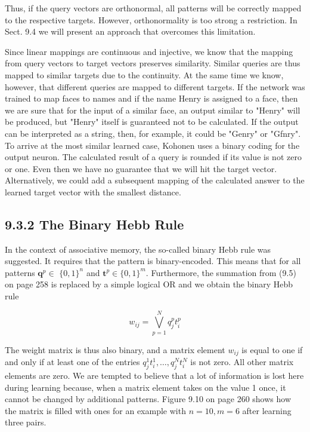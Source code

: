 \documentclass[10pt]{article}
\begin{document}
Thus, if the query vectors are orthonormal, all patterns will be correctly mapped to the respective targets. However, orthonormality is too strong a restriction. In Sect. 9.4 we will present an approach that overcomes this limitation.

Since linear mappings are continuous and injective, we know that the mapping from query vectors to target vectors preserves similarity. Similar queries are thus mapped to similar targets due to the continuity. At the same time we know, however, that different queries are mapped to different targets. If the network was trained to map faces to names and if the name Henry is assigned to a face, then we are sure that for the input of a similar face, an output similar to "Henry" will be produced, but "Henry" itself is guaranteed not to be calculated. If the output can be interpreted as a string, then, for example, it could be "Genry" or "Gfnry". To arrive at the most similar learned case, Kohonen uses a binary coding for the output neuron. The calculated result of a query is rounded if its value is not zero or one. Even then we have no guarantee that we will hit the target vector. Alternatively, we could add a subsequent mapping of the calculated answer to the learned target vector with the smallest distance.

\subsection*{9.3.2 The Binary Hebb Rule}
In the context of associative memory, the so-called binary Hebb rule was suggested. It requires that the pattern is binary-encoded. This means that for all patterns $\boldsymbol{q}^{p} \in$ $\{0,1\}^{n}$ and $\boldsymbol{t}^{p} \in\{0,1\}^{m}$. Furthermore, the summation from (9.5) on page 258 is replaced by a simple logical OR and we obtain the binary Hebb rule


\begin{equation*}
w_{i j}=\bigvee_{p=1}^{N} q_{j}^{p} t_{i}^{p} \tag{9.10}
\end{equation*}


The weight matrix is thus also binary, and a matrix element $w_{i j}$ is equal to one if and only if at least one of the entries $q_{j}^{1} t_{i}^{1}, \ldots, q_{j}^{N} t_{i}^{N}$ is not zero. All other matrix elements are zero. We are tempted to believe that a lot of information is lost here during learning because, when a matrix element takes on the value 1 once, it cannot be changed by additional patterns. Figure 9.10 on page 260 shows how the matrix is filled with ones for an example with $n=10, m=6$ after learning three pairs.
\end{document}
